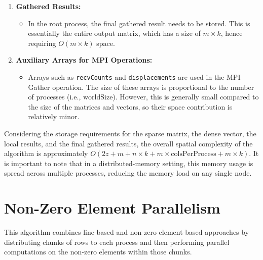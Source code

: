 \documentclass[12pt,oneside]{book} %
\begin{document}
\begin{enumerate}
    \item \textbf{Gathered Results:}
          \begin{itemize}
              \item In the root process, the final gathered result needs to be stored. This is
                    essentially the entire output matrix, which has a size of \( m \times k \),
                    hence requiring \( O(m \times k) \) space.
          \end{itemize}

    \item \textbf{Auxiliary Arrays for MPI Operations:}
          \begin{itemize}
              \item Arrays such as \texttt{recvCounts} and \texttt{displacements} are used in the
                    MPI Gather operation. The size of these arrays is proportional to the number of
                    processes (i.e., \(\text{worldSize}\)). However, this is generally small
                    compared to the size of the matrices and vectors, so their space contribution
                    is relatively minor.
          \end{itemize}
\end{enumerate}

Considering the storage requirements for the sparse matrix, the dense vector,
the local results, and the final gathered results, the overall spatial
complexity of the algorithm is approximately \( O(2z + m + n \times k + m
\times \text{colsPerProcess} + m \times k) \). It is important to note that in
a distributed-memory setting, this memory usage is spread across multiple
processes, reducing the memory load on any single node.

\newpage
\section{Non-Zero Element Parallelism}
This algorithm combines line-based and non-zero element-based approaches by
distributing chunks of rows to each process and then performing parallel
computations on the non-zero elements within those chunks.
\end{document}
